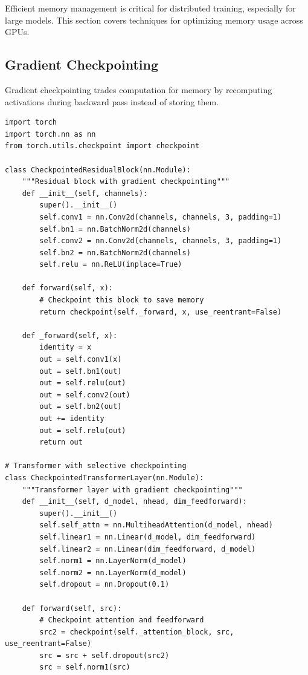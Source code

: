 Efficient memory management is critical for distributed training, especially for large models. This section covers techniques for optimizing memory usage across GPUs.

\subsection{Gradient Checkpointing}

Gradient checkpointing trades computation for memory by recomputing activations during backward pass instead of storing them.

\begin{lstlisting}[style=python, caption=Gradient checkpointing implementation]
import torch
import torch.nn as nn
from torch.utils.checkpoint import checkpoint

class CheckpointedResidualBlock(nn.Module):
    """Residual block with gradient checkpointing"""
    def __init__(self, channels):
        super().__init__()
        self.conv1 = nn.Conv2d(channels, channels, 3, padding=1)
        self.bn1 = nn.BatchNorm2d(channels)
        self.conv2 = nn.Conv2d(channels, channels, 3, padding=1)
        self.bn2 = nn.BatchNorm2d(channels)
        self.relu = nn.ReLU(inplace=True)

    def forward(self, x):
        # Checkpoint this block to save memory
        return checkpoint(self._forward, x, use_reentrant=False)

    def _forward(self, x):
        identity = x
        out = self.conv1(x)
        out = self.bn1(out)
        out = self.relu(out)
        out = self.conv2(out)
        out = self.bn2(out)
        out += identity
        out = self.relu(out)
        return out

# Transformer with selective checkpointing
class CheckpointedTransformerLayer(nn.Module):
    """Transformer layer with gradient checkpointing"""
    def __init__(self, d_model, nhead, dim_feedforward):
        super().__init__()
        self.self_attn = nn.MultiheadAttention(d_model, nhead)
        self.linear1 = nn.Linear(d_model, dim_feedforward)
        self.linear2 = nn.Linear(dim_feedforward, d_model)
        self.norm1 = nn.LayerNorm(d_model)
        self.norm2 = nn.LayerNorm(d_model)
        self.dropout = nn.Dropout(0.1)

    def forward(self, src):
        # Checkpoint attention and feedforward
        src2 = checkpoint(self._attention_block, src, use_reentrant=False)
        src = src + self.dropout(src2)
        src = self.norm1(src)


\end{lstlisting}
